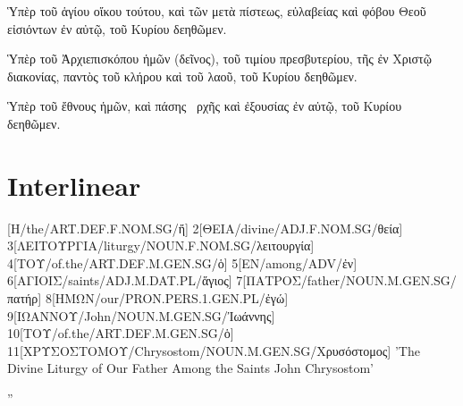 \documentclass[extrafontsizes,17pt]{memoir}
\begin{document}
\a 

Ὑπὲρ τοῦ ἁγίου οἴκου τούτου, καὶ τῶν μετὰ πίστεως, εὐλαβείας καὶ φόβου Θεοῦ εἰσιόντων ἐν αὐτῷ, τοῦ Κυρίου δεηθῶμεν.

\a

Ὑπὲρ τοῦ Ἀρχιεπισκόπου ἡμῶν (δεῖνος), τοῦ τιμίου πρεσβυτερίου, τῆς ἐν Χριστῷ διακονίας, παντὸς τοῦ κλήρου καὶ τοῦ λαοῦ, τοῦ Κυρίου δεηθῶμεν.

\a 

Ὑπὲρ τοῦ ἔθνους ἡμῶν, καὶ πάσης  ρχῆς καὶ ἐξουσίας ἐν αὐτῷ, τοῦ Κυρίου δεηθῶμεν.

\xe

\section{Interlinear}

\begingroup
{}

\pex

\a

[H/the/ART.DEF.F.NOM.SG/ἤ]
2[ΘΕΙΑ/divine/ADJ.F.NOM.SG/θεία]
3[ΛΕΙΤΟΥΡΓΙΑ/liturgy/NOUN.F.NOM.SG/λειτουργία]
4[ΤΟΥ/of.the/ART.DEF.M.GEN.SG/ὁ]
5[ΕΝ/among/ADV/ἐν]
6[ΑΓΙΟΙΣ/saints/ADJ.M.DAT.PL/ἅγιος]
7[ΠΑΤΡΟΣ/father/NOUN.M.GEN.SG/πατήρ]
8[ΗΜΩΝ/our/PRON.PERS.1.GEN.PL/ἐγώ]
9[ΙΩΑΝΝΟΥ/John/NOUN.M.GEN.SG/Ἰωάννης]
10[ΤΟΥ/of.the/ART.DEF.M.GEN.SG/ὁ]
11[ΧΡΥΣΟΣΤΟΜΟΥ/Chrysostom/NOUN.M.GEN.SG/Χρυσόστομος]
\glft 
'The Divine Liturgy of Our Father Among the Saints John Chrysostom'
\endgl

\a

\begingl
\glft 
''
\endgl


\xe

\endgroup
\end{document}
